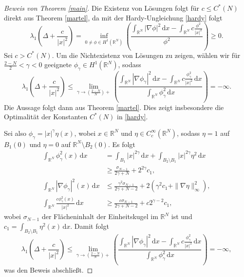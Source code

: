 \documentclass[11pt,twoside,a4paper]{article}
\theoremstyle{break}
\begin{document}
\begin{proof}[Beweis von Theorem \ref{main}]
Die Existenz von Lösungen folgt für $c\le C^*(N)$ direkt aus Theorem \ref{martel}, da mit der Hardy-Ungleichung \eqref{hardy} folgt
\begin{equation}
\lambda_1(\Delta + \frac{c}{|x|^2})= \inf_{0\neq \phi \in H^1(\mathbb R^N)} \left ( \frac{\int_{\mathbb R^N} |\nabla \phi|^2 \, \mathrm dx - \int_{\mathbb R^N} c \frac{\phi^2}{|x|^2}}{\phi^2} \right )\ge 0.
\end{equation}
Sei $c>C^*(N)$. Um die Nichtexistenz von Lösungen zu zeigen, wählen wir für $\frac{2-N}{2}<\gamma <0$ geeignete $\phi_\gamma\in H^1(\mathbb R^N)$, sodass
\begin{equation}
\lambda_1(\Delta + \frac{c}{|x|^2})\le \lim_{\gamma \to (\tfrac{2-N}{N})+} \left ( \frac{\int_{\mathbb R^N} |\nabla \phi_\gamma|^2\, \mathrm dx- \int_{\mathbb R^N} c \frac{\phi^2_{\gamma}}{|x|^2}\, \mathrm dx}{\int_{\mathbb R^N} \phi^2_\gamma  \, \mathrm dx} \right )=-\infty.
\end{equation}
Die Aussage folgt dann aus Theorem \ref{martel}. Dies zeigt insbesondere die Optimalität der Konstanten $C^*(N)$ in \eqref{hardy}.

Sei also $\phi_\gamma= |x|^\gamma \eta(x)$, wobei $x\in \mathbb R^N$ und $\eta\in C_c^\infty(\mathbb R^N)$, sodass $\eta =1$ auf $B_1(0)$ und $\eta=0$ auf $\mathbb R^N\setminus B_2(0)$.  Es folgt
\begin{align*}
\int_{\mathbb R^N} \phi^2_\gamma(x)\, \mathrm dx &= \int_{B_1} |x|^{2\gamma} \, \mathrm dx + \int_{B_2\setminus B_1} |x|^{2\gamma} \eta^2\, \mathrm dx\\
&\ge \frac{\sigma_{N-1}}{2\gamma+N} + 2^{2\gamma} c_1,\\
\int_{\mathbb R^N} |\nabla \phi_\gamma|^2(x)\, \mathrm dx &\le \frac{\gamma^2 \sigma_{N-1}}{2\gamma +N-2}+ 2(\gamma^2 c_1+ \| \nabla \eta\|^2_\infty),\\
\int_{\mathbb R^N} \frac{c\phi_\gamma^2(x)}{|x|^2} \, \mathrm dx &\ge \frac{c\sigma_{N-1}}{2\gamma+N-2} + c 2^{\gamma -2}c_1,
\end{align*}
wobei $\sigma_{N-1}$ der Flächeninhalt der Einheitskugel im $\mathbb R^N$ ist und $c_1=\int_{B_2 \setminus B_1} \eta^2(x)\, \mathrm dx$. Damit folgt
\begin{equation}
\lambda_1(\Delta + \frac{c}{|x|^2}) \le \lim_{\gamma \to (\tfrac{2-N}{N})+} \left ( \frac{\int_{\mathbb R^N} |\nabla \phi_\gamma|^2\, \mathrm dx- \int_{\mathbb R^N} c \frac{\phi^2_{\gamma}}{|x|^2}\, \mathrm dx}{\int_{\mathbb R^N} \phi^2_\gamma  \, \mathrm dx} \right )=-\infty,
\end{equation}
was den Beweis abschließt.


\end{proof}
\end{document}
